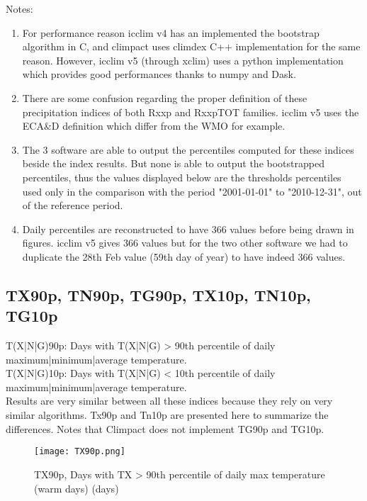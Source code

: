 \documentclass[a4paper,11pt]{article}
\begin{document}
        Notes:
        \begin{enumerate}
            \item For performance reason icclim v4 has an implemented the bootstrap algorithm in C, and climpact uses climdex C++ implementation for the same reason. However, icclim v5 (through xclim) uses a python implementation which provides good performances thanks to numpy and Dask.
            \item There are some confusion regarding the proper definition of these precipitation indices of both Rxxp and RxxpTOT families. icclim v5 uses the ECA\&D definition which differ from the WMO for example.
            \item The 3 software are able to output the percentiles computed for these indices beside the index results. But none is able to output the bootstrapped percentiles, thus the values displayed below are the thresholds percentiles used only in the comparison with the period "2001-01-01" to "2010-12-31", out of the reference period.
            \item Daily percentiles are reconstructed to have 366 values before being drawn in figures. icclim v5 gives 366 values but for the two other software we had to duplicate the 28th Feb value (59th day of year) to have indeed 366 values.
        \end{enumerate}

        \subsection{TX90p, TN90p, TG90p, TX10p, TN10p, TG10p}
            T(X|N|G)90p: Days with T(X|N|G) > 90th percentile of daily maximum|minimum|average temperature.\\
            T(X|N|G)10p: Days with T(X|N|G) < 10th percentile of daily maximum|minimum|average temperature.\\

            Results are very similar between all these indices because they rely on very similar algorithms. 
            Tx90p and Tn10p are presented here to summarize the differences.
            Notes that Climpact does not implement TG90p and TG10p.

            \begin{figure}[!hbt]
                \centering
                \texttt{[image: TX90p.png]}
                \caption{TX90p, Days with TX > 90th percentile of daily max temperature (warm days) (days)}
                \label{figure/tx90p}
            \end{figure}
\end{document}
